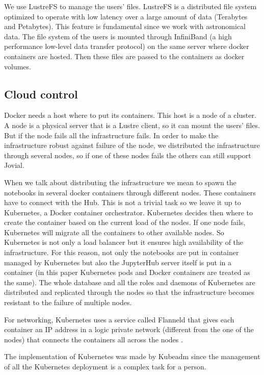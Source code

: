 \documentclass[11pt,twoside]{article}
\begin{document}
We use LustreFS to manage the users' files. LustreFS is a distributed file system optimized to operate with low latency over a large amount of data (Terabytes and Petabytes). This feature is fundamental since we work with astronomical data. The file system of the users is mounted through InfiniBand (a high performance low-level data transfer protocol) on the same server where docker containers are hosted. Then these files are passed to the containers as docker volumes.

\subsection{Cloud control}

Docker needs a host where to put its containers. This host is a node of a cluster. A node is a physical server that is a Lustre client, so it can mount the users' files. But if the node fails all the infrastructure fails. In order to make the infrastructure robust against failure of the node, we distributed the infrastructure through several nodes, so if one of these nodes fails the others can still support Jovial. 

When we talk about distributing the infrastructure we mean to spawn the notebooks in several docker containers through different nodes. These containers have to connect with the Hub. This is not a trivial task so we leave it up to Kubernetes, a Docker container orchestrator. Kubernetes decides then where to create the container based on the current load of the nodes.  If one node fails, Kubernetes will migrate all the containers to other available nodes. So Kubernetes is not only a load balancer but it ensures high availability of the infrastructure. For this reason, not only the notebooks are put in container managed by Kubernetes but also the JupyterHub server itself is put in a container (in this paper Kubernetes pods and Docker containers are treated as the same). The whole database and all the roles and daemons of Kubernetes are distributed and replicated through the nodes so that the infrastructure becomes resistant to the failure of multiple nodes.

For networking, Kubernetes uses a service called Flanneld that gives each container an IP address in a logic private network (different from the one of the nodes) that connects the containers all across the nodes \citep{zismer2016performance}. 

The implementation of Kubernetes was made by Kubeadm since the management of all the Kubernetes deployment is a complex task for a person.
\end{document}

